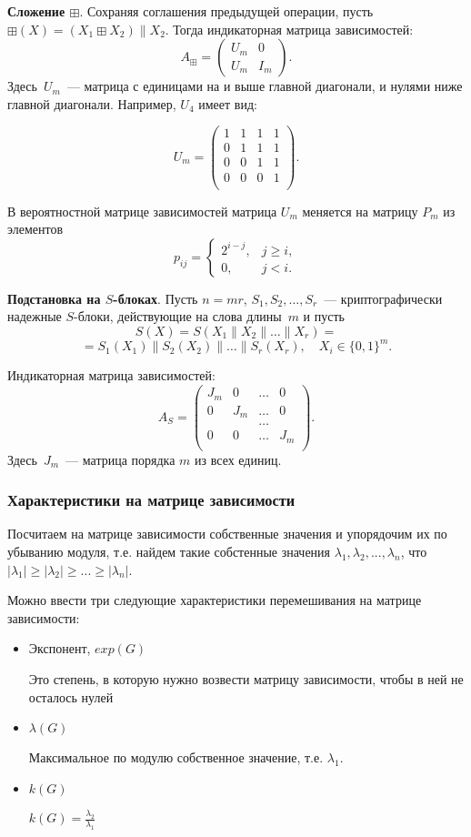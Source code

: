 \documentclass{beamer}
\begin{document}
{\bf Сложение $\boxplus$}.
Сохраняя соглашения предыдущей операции,
пусть $\boxplus(X)=(X_1\boxplus X_2)\parallel X_2$.
Тогда индикаторная матрица зависимостей:
$$
A_\boxplus = 
\begin{pmatrix} 
U_m & 0\\ 
U_m & I_m 
\end{pmatrix}.
$$
Здесь~$U_m$~--- матрица с единицами на и выше главной диагонали,
и нулями ниже главной диагонали. 
Например, $U_4$ имеет вид:

$$
U_m = 
\begin{pmatrix} 
1 & 1 & 1 & 1\\ 
0 & 1 & 1 & 1\\ 
0 & 0 & 1 & 1\\
0 & 0 & 0 & 1\\
\end{pmatrix}.
$$

В вероятностной матрице зависимостей матрица 
$U_m$ меняется на матрицу $P_m$ из элементов 
$$
p_{ij}=\begin{cases}
2^{i-j}, & j\geq i,\\
0,       & j< i.
\end{cases}
$$

{\bf Подстановка на $S$-блоках}.
Пусть $n=mr$, $S_1,S_2,\ldots,S_r$~---
криптографически надежные $S$-блоки,
действующие на слова длины~$m$ и 
пусть 
$$S(X)=S(X_1\parallel X_2\parallel\ldots\parallel X_r)=$$
$$=S_1(X_1)\parallel S_2(X_2)\parallel\ldots\parallel S_r(X_r),\quad
X_i\in\{0,1\}^m.
$$

Индикаторная матрица зависимостей:
$$
A_S = 
\begin{pmatrix} 
J_m & 0 & \ldots & 0\\ 
0 & J_m & \ldots & 0\\
  &     & \ldots &\\
0 &  0  & \ldots & J_m\\
\end{pmatrix}.
$$
Здесь~$J_m$~--- матрица порядка $m$ из всех единиц.


\begin{frame}
    \frametitle{Характеристики на матрице зависимости}

Посчитаем на матрице зависимости собственные значения и упорядочим их по убыванию модуля, т.е. найдем такие собстенные значения $\lambda_1, \lambda_2, ..., \lambda_n$, что $|\lambda_1| \ge |\lambda_2| \ge ... \ge |\lambda_n|$.

 Можно ввести три следующие характеристики перемешивания на матрице зависимости:

\begin{itemize}
\item Экспонент, $exp(G)$

Это степень, в которую нужно возвести матрицу зависимости, чтобы в ней не осталось нулей
\item $\lambda(G)$

Максимальное по модулю собственное значение, т.е. $\lambda_1$.
\item $k(G)$

$k(G) = \frac{\lambda_2}{\lambda_1}$
\end{itemize}

  \end{frame}
\end{document}
